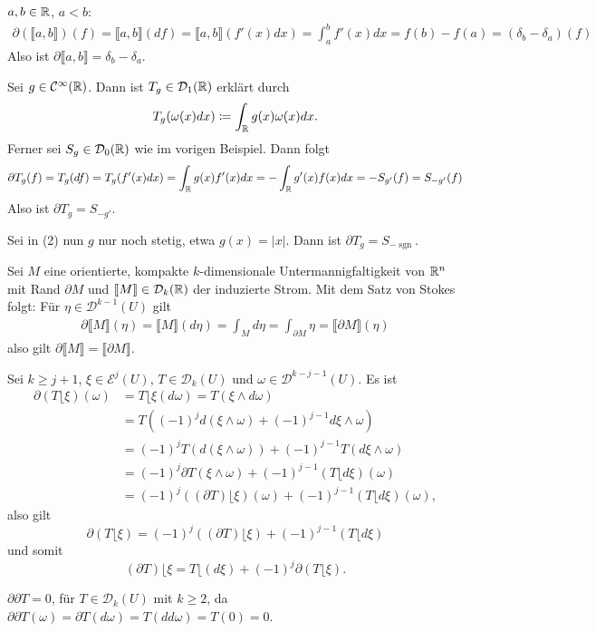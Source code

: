 \documentclass[a4paper,twoside,DIV15,BCOR12mm]{scrbook}
\newcommand{\MR}{\lfloor}
\begin{document}
\begin{beispiele}
\item $a,b\in \mathbb{R}$, $a<b$:
\begin{align*}
\partial(\llbracket a,b\rrbracket) (f) = \llbracket a,b\rrbracket(df) = \llbracket a,b\rrbracket(f'(x)dx) = \int_a^b f'(x) dx = f(b)-f(a) = (\delta_b-\delta_a)(f)
\end{align*}
Also ist $\partial\llbracket a,b\rrbracket = \delta_b - \delta_a$.

\item Sei $g\in \mathcal C^\infty(\mathbb{R})$. Dann ist $T_g\in \mathcal D_1(\mathbb{R})$ erklärt durch
\begin{align*}
T_g(\omega(x)dx) \da \int_\MdR g(x) \omega(x) dx.
\end{align*}
Ferner sei $S_g\in\mathcal D_0(\mathbb{R})$ wie im vorigen Beispiel. Dann folgt
\begin{align*}
\partial T_g(f) = T_g(df) = T_g(f'(x)dx) = \int_{\mathbb{R}} g(x) f'(x) dx = -\int_{\mathbb{R}} g'(x) f(x) dx = -S_{g'}(f) = S_{-g'}(f)
\end{align*}
Also ist $\partial T_g = S_{-g'}$.
\item Sei in (2) nun $g$ nur noch stetig, etwa $g(x) = |x|$. Dann ist $\partial T_g = S_{-\operatorname{sgn}}$.
\item Sei $M$ eine orientierte, kompakte $k$-dimensionale Untermannigfaltigkeit von $\mathbb{R}^n$ mit Rand $\partial M$ und $\llbracket M \rrbracket\in\mathcal D_k(\mathbb{R})$ der induzierte Strom. Mit dem Satz von Stokes folgt: Für $\eta \in \mathcal D^{k-1}(U)$ gilt
\begin{align*}
\partial\llbracket M \rrbracket (\eta) = \llbracket M \rrbracket (d\eta) = \int_M d \eta = \int_{\partial M} \eta = \llbracket \partial M\rrbracket(\eta)
\end{align*}
also gilt $\partial\llbracket M \rrbracket = \llbracket \partial M\rrbracket$.
\item Sei $k \ge j + 1$, $\xi\in\mathcal E^{j}(U)$, $T\in\mathcal D_k(U)$ und $\omega \in \mathcal D^{k-j-1}(U)$. Es ist
\begin{align*}
\partial(T\MR \xi)(\omega)
&= T\MR\xi(d\omega) =  T(\xi\wedge d\omega)\\
&= T( (-1)^j d(\xi\wedge \omega) + (-1)^{j-1} d\xi \wedge\omega)\\
&= (-1)^jT(d(\xi\wedge\omega)) + (-1)^{j-1} T(d\xi \wedge \omega) \\
&= (-1)^j\partial T(\xi\wedge \omega) + (-1)^{j-1} (T\MR d\xi)(\omega) \\
&= (-1)^j( (\partial T) \MR \xi)(\omega) + (-1)^{j-1} (T\MR d\xi)(\omega),
\end{align*}
also gilt
\[
\partial(T\MR \xi) = (-1)^j ( (\partial T) \MR \xi) + (-1)^{j-1} (T\MR d\xi)
\]
und somit
\[
(\partial T) \MR \xi = T\MR (d\xi) + (-1)^j \partial (T\MR \xi).
\]
\item $\partial\partial T=0$, für $T\in\mathcal D_k(U)$ mit $k\ge 2$, da $\partial\partial T(\omega) = \partial T(d\omega) = T(dd\omega)=T(0)=0$.
\end{beispiele}
\end{document}
